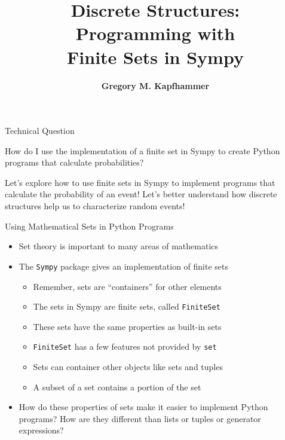 \documentclass[14pt,aspectratio=169]{beamer}
\title{Discrete Structures: \\ Programming with \\ Finite Sets in Sympy}
\author{{\bf Gregory M. Kapfhammer}}
\institute[shortinst]{{\bf Department of Computer Science, Allegheny College}}
\begin{document}
{
  \begin{frame}
    \titlepage
  \end{frame}
}

%
\begin{frame}{Technical Question}
  \hspace*{.5in}
  \begin{minipage}{4.3in}
    \vspace*{.1in}
    \begin{center}
      {\large How do I use the implementation of a finite set in Sympy to
      create Python programs that calculate probabilities?}
    \end{center}
  \end{minipage}
  \vspace{2ex}
  \begin{center}
    \small Let's explore how to use finite sets in Sympy to implement programs
    that calculate the probability of an event! Let's better understand
    how discrete structures help us to characterize random events!
  \end{center}
\end{frame}

%
\begin{frame}{Using Mathematical Sets in Python Programs}
  \begin{itemize}
    \item Set theory is important to many areas of mathematics
      \vspace*{-.15in}
    \item The {\tt Sympy} package gives an implementation of finite sets
      \begin{itemize}
        \item Remember, sets are ``containers'' for other elements
        \item The sets in Sympy are finite sets, called {\tt FiniteSet}
        \item These sets have the same properties as built-in sets
        \item {\tt FiniteSet} has a few features not provided by {\tt set}
        \item Sets can container other objects like sets and tuples
        \item A subset of a set contains a portion of the set
      \end{itemize}
      \vspace*{-.2in}
    \item How do these properties of sets make it easier to implement Python
      programs? How are they different than lists or tuples or generator
      expressions?
  \end{itemize}
\end{frame}
\end{document}
